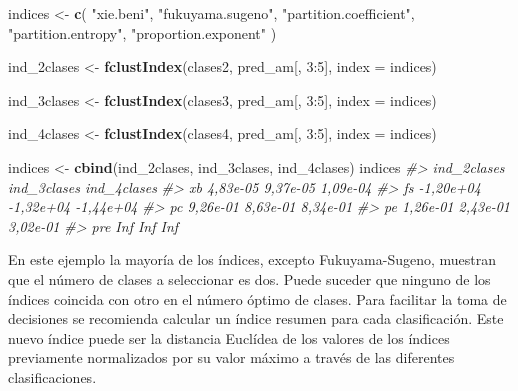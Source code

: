 \documentclass[11pt,b5paper,]{krantz}
\newenvironment{Shaded}{}{}
\newcommand{\KeywordTok}[1]{\textcolor[rgb]{0.00,0.44,0.13}{\textbf{#1}}}
\newcommand{\DataTypeTok}[1]{\textcolor[rgb]{0.56,0.13,0.00}{#1}}
\newcommand{\DecValTok}[1]{\textcolor[rgb]{0.25,0.63,0.44}{#1}}
\newcommand{\StringTok}[1]{\textcolor[rgb]{0.25,0.44,0.63}{#1}}
\newcommand{\CommentTok}[1]{\textcolor[rgb]{0.38,0.63,0.69}{\textit{#1}}}
\newcommand{\OperatorTok}[1]{\textcolor[rgb]{0.40,0.40,0.40}{#1}}
\newcommand{\NormalTok}[1]{#1}
\begin{document}
\begin{Shaded}
\begin{Highlighting}[]
\NormalTok{indices <-}\StringTok{  }\KeywordTok{c}\NormalTok{(}
  \StringTok{"xie.beni"}\NormalTok{,}
  \StringTok{"fukuyama.sugeno"}\NormalTok{,}
  \StringTok{"partition.coefficient"}\NormalTok{,}
  \StringTok{"partition.entropy"}\NormalTok{,}
  \StringTok{"proportion.exponent"}
\NormalTok{)}

\NormalTok{ind_2clases <-}
\StringTok{  }\KeywordTok{fclustIndex}\NormalTok{(clases2,}
\NormalTok{              pred_am[, }\DecValTok{3}\OperatorTok{:}\DecValTok{5}\NormalTok{],}
              \DataTypeTok{index =}\NormalTok{ indices)}

\NormalTok{ind_3clases <-}
\StringTok{  }\KeywordTok{fclustIndex}\NormalTok{(clases3,}
\NormalTok{              pred_am[, }\DecValTok{3}\OperatorTok{:}\DecValTok{5}\NormalTok{],}
              \DataTypeTok{index =}\NormalTok{ indices)}

\NormalTok{ind_4clases <-}
\StringTok{  }\KeywordTok{fclustIndex}\NormalTok{(clases4,}
\NormalTok{              pred_am[, }\DecValTok{3}\OperatorTok{:}\DecValTok{5}\NormalTok{],}
              \DataTypeTok{index =}\NormalTok{ indices)}

\NormalTok{indices <-}\StringTok{ }\KeywordTok{cbind}\NormalTok{(ind_2clases, }
\NormalTok{                 ind_3clases, }
\NormalTok{                 ind_4clases)}
\NormalTok{indices}
\CommentTok{#>     ind_2clases ind_3clases ind_4clases}
\CommentTok{#> xb     4,83e-05    9,37e-05    1,09e-04}
\CommentTok{#> fs    -1,20e+04   -1,32e+04   -1,44e+04}
\CommentTok{#> pc     9,26e-01    8,63e-01    8,34e-01}
\CommentTok{#> pe     1,26e-01    2,43e-01    3,02e-01}
\CommentTok{#> pre         Inf         Inf         Inf}
\end{Highlighting}
\end{Shaded}

En este ejemplo la mayoría de los índices, excepto Fukuyama-Sugeno,
muestran que el número de clases a seleccionar es dos. Puede suceder que
ninguno de los índices coincida con otro en el número óptimo de clases.
Para facilitar la toma de decisiones se recomienda calcular un índice
resumen para cada clasificación. Este nuevo índice puede ser la
distancia Euclídea de los valores de los índices previamente
normalizados por su valor máximo a través de las diferentes
clasificaciones.
\end{document}
